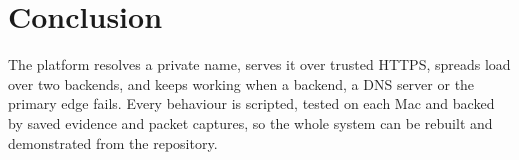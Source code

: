 \documentclass[11pt,a4paper]{article}
\begin{document}
\section{Conclusion}
The platform resolves a private name, serves it over trusted HTTPS, spreads
load over two backends, and keeps working when a backend, a DNS server or the
primary edge fails. Every behaviour is scripted, tested on each Mac and backed
by saved evidence and packet captures, so the whole system can be rebuilt and
demonstrated from the repository.
\end{document}
